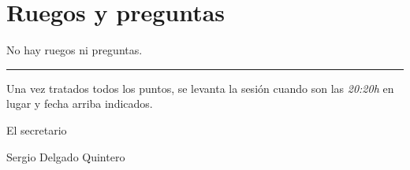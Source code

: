 \documentclass[a4paper, 12pt]{article}
\begin{document}
    \section{Ruegos y preguntas}
    
    No hay ruegos ni preguntas.
    
    
    \vspace{1cm}
    \hrule
    \vspace{3mm}
    
    Una vez tratados todos los puntos, se levanta la sesión cuando son las \textit{20:20h} en lugar y fecha arriba indicados.
    
    \begin{flushright}
    El secretario
    
    Sergio Delgado Quintero
    \end{flushright}
    
    
\end{document}
